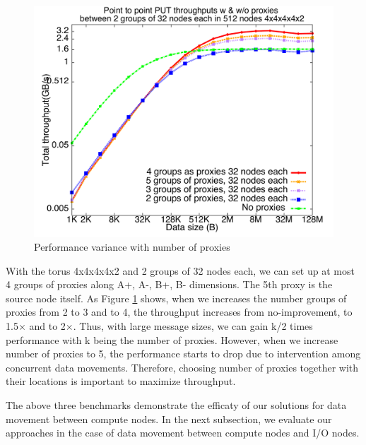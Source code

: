 \begin{figure}[!htb]
\vspace{-0.1in}
\centering
\includegraphics[scale=0.3]{figures/num_groxies}
\vspace{-0.2in}
\caption{Performance variance with number of proxies}
\label{fig:num_groxies}
\vspace{-0.1in}
\end{figure}

With the torus 4x4x4x4x2 and 2 groups of 32 nodes each, we can set up at most 4 groups of proxies along A+, A-, B+, B- dimensions. The 5th proxy is the source node itself. As Figure \ref{fig:num_groxies} shows, when we increases the number groups of proxies from 2 to 3 and to 4, the throughput increases from no-improvement, to 1.5$\times$ and to 2$\times$. Thus, with large message sizes, we can gain k/2 times performance with k being the number of proxies. However, when we increase number of proxies to 5, the performance starts to drop due to intervention among concurrent data movements. Therefore, choosing number of proxies together with their locations is important to maximize throughput.

The above three benchmarks demonstrate the efficaty of our solutions for data movement between compute nodes. In the next subsection, we evaluate our approaches in the case of data movement between compute nodes and I/O nodes. 



